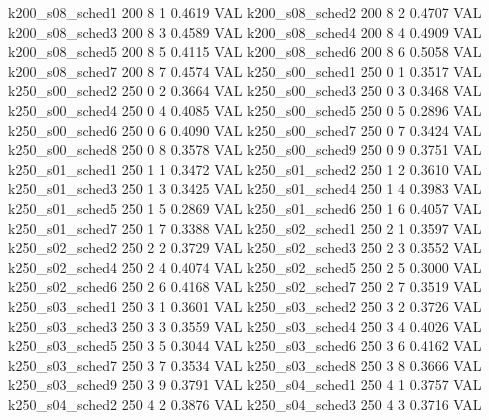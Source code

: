   k200_s08_sched1                  200    8   1    0.4619  VAL
  k200_s08_sched2                  200    8   2    0.4707  VAL
  k200_s08_sched3                  200    8   3    0.4589  VAL
  k200_s08_sched4                  200    8   4    0.4909  VAL
  k200_s08_sched5                  200    8   5    0.4115  VAL
  k200_s08_sched6                  200    8   6    0.5058  VAL
  k200_s08_sched7                  200    8   7    0.4574  VAL
  k250_s00_sched1                  250    0   1    0.3517  VAL
  k250_s00_sched2                  250    0   2    0.3664  VAL
  k250_s00_sched3                  250    0   3    0.3468  VAL
  k250_s00_sched4                  250    0   4    0.4085  VAL
  k250_s00_sched5                  250    0   5    0.2896  VAL
  k250_s00_sched6                  250    0   6    0.4090  VAL
  k250_s00_sched7                  250    0   7    0.3424  VAL
  k250_s00_sched8                  250    0   8    0.3578  VAL
  k250_s00_sched9                  250    0   9    0.3751  VAL
  k250_s01_sched1                  250    1   1    0.3472  VAL
  k250_s01_sched2                  250    1   2    0.3610  VAL
  k250_s01_sched3                  250    1   3    0.3425  VAL
  k250_s01_sched4                  250    1   4    0.3983  VAL
  k250_s01_sched5                  250    1   5    0.2869  VAL
  k250_s01_sched6                  250    1   6    0.4057  VAL
  k250_s01_sched7                  250    1   7    0.3388  VAL
  k250_s02_sched1                  250    2   1    0.3597  VAL
  k250_s02_sched2                  250    2   2    0.3729  VAL
  k250_s02_sched3                  250    2   3    0.3552  VAL
  k250_s02_sched4                  250    2   4    0.4074  VAL
  k250_s02_sched5                  250    2   5    0.3000  VAL
  k250_s02_sched6                  250    2   6    0.4168  VAL
  k250_s02_sched7                  250    2   7    0.3519  VAL
  k250_s03_sched1                  250    3   1    0.3601  VAL
  k250_s03_sched2                  250    3   2    0.3726  VAL
  k250_s03_sched3                  250    3   3    0.3559  VAL
  k250_s03_sched4                  250    3   4    0.4026  VAL
  k250_s03_sched5                  250    3   5    0.3044  VAL
  k250_s03_sched6                  250    3   6    0.4162  VAL
  k250_s03_sched7                  250    3   7    0.3534  VAL
  k250_s03_sched8                  250    3   8    0.3666  VAL
  k250_s03_sched9                  250    3   9    0.3791  VAL
  k250_s04_sched1                  250    4   1    0.3757  VAL
  k250_s04_sched2                  250    4   2    0.3876  VAL
  k250_s04_sched3                  250    4   3    0.3716  VAL
